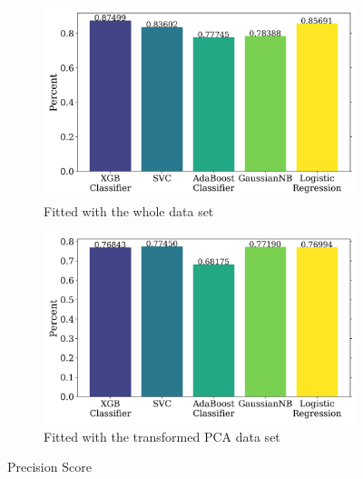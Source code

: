 \documentclass{article}
\begin{document}
\begin{figure}[H]
    \centering
    \begin{subfigure}[t]{0.495\textwidth}
        \centering
        \includegraphics[width=\textwidth]{precision_notpca.png}
        \caption{Fitted with the whole data set}
        \label{fig:precision_notpca}
    \end{subfigure}
    \hfill
    \begin{subfigure}[t]{0.495\textwidth}
        \centering
        \includegraphics[width=\textwidth]{precision_pca.png}
        \caption{Fitted with the transformed PCA data set}
        \label{fig:precision_pca}
    \end{subfigure}
    \caption{Precision Score}
    \label{fig:precision}
\end{figure}
\end{document}
